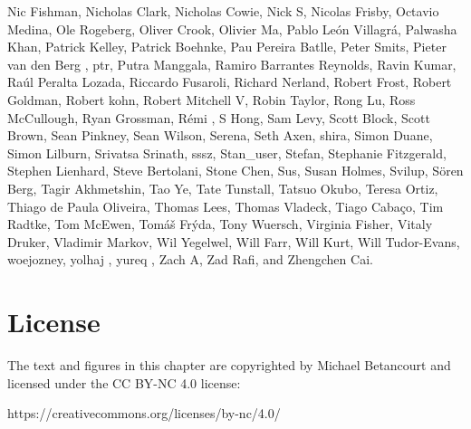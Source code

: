 \documentclass[
  letterpaper,
  DIV=11,
  numbers=noendperiod]{scrartcl}
\begin{document}
Nic Fishman, Nicholas Clark, Nicholas Cowie, Nick S, Nicolas Frisby,
Octavio Medina, Ole Rogeberg, Oliver Crook, Olivier Ma, Pablo León
Villagrá, Palwasha Khan, Patrick Kelley, Patrick Boehnke, Pau Pereira
Batlle, Peter Smits, Pieter van den Berg , ptr, Putra Manggala, Ramiro
Barrantes Reynolds, Ravin Kumar, Raúl Peralta Lozada, Riccardo Fusaroli,
Richard Nerland, Robert Frost, Robert Goldman, Robert kohn, Robert
Mitchell V, Robin Taylor, Rong Lu, Ross McCullough, Ryan Grossman, Rémi
, S Hong, Sam Levy, Scott Block, Scott Brown, Sean Pinkney, Sean Wilson,
Serena, Seth Axen, shira, Simon Duane, Simon Lilburn, Srivatsa Srinath,
sssz, Stan\_user, Stefan, Stephanie Fitzgerald, Stephen Lienhard, Steve
Bertolani, Stone Chen, Sus, Susan Holmes, Svilup, Sören Berg, Tagir
Akhmetshin, Tao Ye, Tate Tunstall, Tatsuo Okubo, Teresa Ortiz, Thiago de
Paula Oliveira, Thomas Lees, Thomas Vladeck, Tiago Cabaço, Tim Radtke,
Tom McEwen, Tomáš Frýda, Tony Wuersch, Virginia Fisher, Vitaly Druker,
Vladimir Markov, Wil Yegelwel, Will Farr, Will Kurt, Will Tudor-Evans,
woejozney, yolhaj , yureq , Zach A, Zad Rafi, and Zhengchen Cai.

\hypertarget{license}{%
\section*{License}\label{license}}

The text and figures in this chapter are copyrighted by Michael
Betancourt and licensed under the CC BY-NC 4.0 license:

https://creativecommons.org/licenses/by-nc/4.0/
\end{document}
